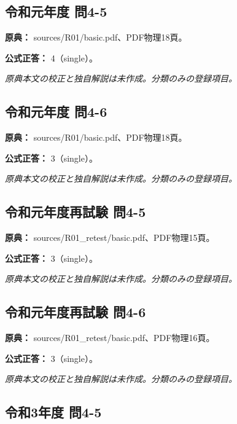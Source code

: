 \subsection{令和元年度 問4-5}
\label{q:r01-reg-basic-4-5}

\noindent\textbf{原典：} sources/R01/basic.pdf、PDF物理18頁。

\textbf{公式正答：} 4（single）。

\par\textit{原典本文の校正と独自解説は未作成。分類のみの登録項目。}

\subsection{令和元年度 問4-6}
\label{q:r01-reg-basic-4-6}

\noindent\textbf{原典：} sources/R01/basic.pdf、PDF物理18頁。

\textbf{公式正答：} 3（single）。

\par\textit{原典本文の校正と独自解説は未作成。分類のみの登録項目。}

\subsection{令和元年度再試験 問4-5}
\label{q:r01-ret-basic-4-5}

\noindent\textbf{原典：} sources/R01\_retest/basic.pdf、PDF物理15頁。

\textbf{公式正答：} 3（single）。

\par\textit{原典本文の校正と独自解説は未作成。分類のみの登録項目。}

\subsection{令和元年度再試験 問4-6}
\label{q:r01-ret-basic-4-6}

\noindent\textbf{原典：} sources/R01\_retest/basic.pdf、PDF物理16頁。

\textbf{公式正答：} 3（single）。

\par\textit{原典本文の校正と独自解説は未作成。分類のみの登録項目。}

\subsection{令和3年度 問4-5}
\label{q:r03-reg-basic-4-5}

